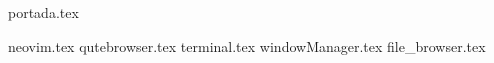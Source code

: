 
{portada.tex}
\newpage
\tableofcontents
\printindex
\newpage

{neovim.tex}
{qutebrowser.tex}
{terminal.tex}
{windowManager.tex}
{file_browser.tex}

